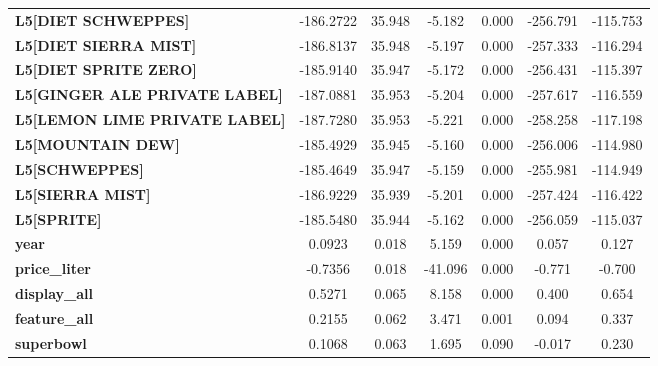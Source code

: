 \begin{center}
\begin{tabular}{lcccccc}
\textbf{L5[DIET SCHWEPPES]}                &    -186.2722  &       35.948     &    -5.182  &         0.000        &     -256.791    &     -115.753     \\
\textbf{L5[DIET SIERRA MIST]}              &    -186.8137  &       35.948     &    -5.197  &         0.000        &     -257.333    &     -116.294     \\
\textbf{L5[DIET SPRITE ZERO]}              &    -185.9140  &       35.947     &    -5.172  &         0.000        &     -256.431    &     -115.397     \\
\textbf{L5[GINGER ALE PRIVATE LABEL]}      &    -187.0881  &       35.953     &    -5.204  &         0.000        &     -257.617    &     -116.559     \\
\textbf{L5[LEMON LIME PRIVATE LABEL]}      &    -187.7280  &       35.953     &    -5.221  &         0.000        &     -258.258    &     -117.198     \\
\textbf{L5[MOUNTAIN DEW]}                  &    -185.4929  &       35.945     &    -5.160  &         0.000        &     -256.006    &     -114.980     \\
\textbf{L5[SCHWEPPES]}                     &    -185.4649  &       35.947     &    -5.159  &         0.000        &     -255.981    &     -114.949     \\
\textbf{L5[SIERRA MIST]}                   &    -186.9229  &       35.939     &    -5.201  &         0.000        &     -257.424    &     -116.422     \\
\textbf{L5[SPRITE]}                        &    -185.5480  &       35.944     &    -5.162  &         0.000        &     -256.059    &     -115.037     \\
\textbf{year}                              &       0.0923  &        0.018     &     5.159  &         0.000        &        0.057    &        0.127     \\
\textbf{price\_liter}                      &      -0.7356  &        0.018     &   -41.096  &         0.000        &       -0.771    &       -0.700     \\
\textbf{display\_all}                      &       0.5271  &        0.065     &     8.158  &         0.000        &        0.400    &        0.654     \\
\textbf{feature\_all}                      &       0.2155  &        0.062     &     3.471  &         0.001        &        0.094    &        0.337     \\
\textbf{superbowl}                         &       0.1068  &        0.063     &     1.695  &         0.090        &       -0.017    &        0.230     \\

\end{tabular}
\end{center}

